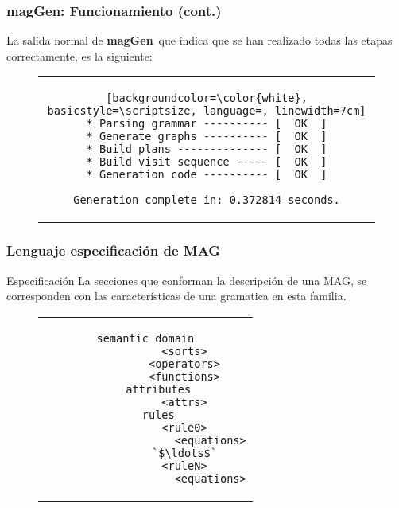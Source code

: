 \documentclass[10pt]{beamer}
\newcommand{\maggen}{\textbf{magGen}}
\begin{document}
\begin{frame}[fragile]
    \frametitle{\maggen: Funcionamiento (cont.)}

    La salida normal de \maggen\ que indica que se han realizado todas las etapas correctamente, es la siguiente:


\begin{figure}[h]
\begin{center}
\begin{tabular}{c}
\begin{lstlisting}[backgroundcolor=\color{white}, basicstyle=\scriptsize, language=, linewidth=7cm]
* Parsing grammar ---------- [  OK  ]
* Generate graphs ---------- [  OK  ]
* Build plans -------------- [  OK  ]
* Build visit sequence ----- [  OK  ]
* Generation code ---------- [  OK  ]

Generation complete in: 0.372814 seconds.
\end{lstlisting}
\end{tabular}
\end{center}
\end{figure}
\end{frame}

\begin{frame}[fragile]
    \frametitle{Lenguaje especificación de MAG}
    \begin{block}{Especificación}
    La secciones que conforman la descripción de una MAG, se corresponden con las características de una gramatica en esta familia.
    \end{block}
    
\begin{figure}[h]
\begin{center}
\begin{tabular}{c}
 \begin{lstlisting}[language=specmag, basicstyle=\small, linewidth=7cm]
    semantic domain
            <sorts>
            <operators>
            <functions>
    attributes
            <attrs>
    rules
            <rule0>
                    <equations>
            `$\ldots$`
            <ruleN>
                    <equations>
\end{lstlisting} 
\end{tabular}
\end{center}
\end{figure}
\end{frame}
\end{document}
